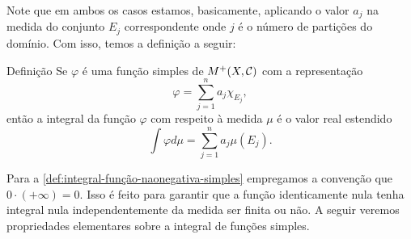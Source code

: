 Note que em ambos os casos estamos, basicamente, aplicando o valor $a_j$ na medida do conjunto $E_j$ correspondente onde $j$ é o número de partições do domínio. Com isso, temos a definição a seguir:
\begin{env}{Definição}
\label{def:integral-função-naonegativa-simples}
    Se $\varphi$ é uma função simples de $M^+(X, \operatorname{\mathcal{C}})$ com a representação 
    $$\varphi =  \sum_{j = 1}^n a_j\chi_{E_j},$$ então a integral da função $\varphi$ com respeito à medida $\mu$ é o valor real estendido
    $$
    \int\varphi d\mu = \sum_{j = 1}^n a_j\mu(E_j).
    $$
\end{env}

Para a \ref{def:integral-função-naonegativa-simples} empregamos a convenção que $0 \cdot (+\infty) = 0$.
Isso é feito para garantir que a função identicamente nula tenha integral nula independentemente da medida ser finita ou não.
A seguir veremos propriedades elementares sobre a integral de funções simples.

